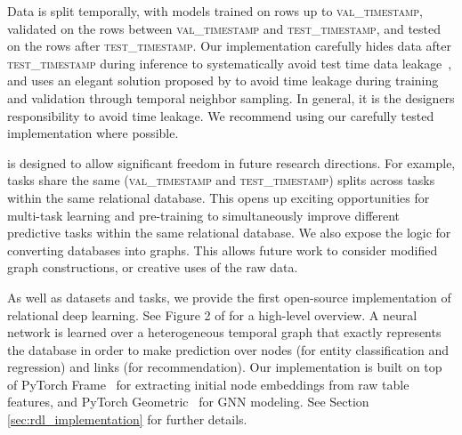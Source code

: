 \vspace{-2pt}
 Data is split temporally, with models trained on rows up to \textsc{val\_timestamp}, validated on the rows between \textsc{val\_timestamp} and \textsc{test\_timestamp}, and tested on the rows after \textsc{test\_timestamp}. 
    Our implementation carefully hides data after \textsc{test\_timestamp} during inference to systematically avoid test time data leakage~\citep{kapoor2023leakage}, and uses an elegant solution proposed by  \citet{fey2023relational} to avoid time leakage during training and validation through temporal neighbor sampling. In general, it is the designers responsibility to avoid time leakage. We recommend using our carefully tested implementation where possible.

\vspace{-2pt}
 \relbench is designed to allow significant freedom in future research directions. For example, \relbench tasks share the same (\textsc{val\_timestamp} and \textsc{test\_timestamp}) splits across tasks within the same relational database. This opens up exciting opportunities for multi-task learning and pre-training to simultaneously improve different predictive tasks within the same relational database. We also expose the logic for converting databases into graphs. This allows future work to consider modified graph constructions, or creative uses of the raw data.


\vspace{-2pt}
As well as datasets and tasks, we provide the first open-source implementation of relational deep learning. See Figure 2 of \citet{fey2023relational} for a high-level overview. A neural network is learned over a heterogeneous temporal graph that exactly represents the database in order to make prediction over nodes (for entity classification and regression) and links (for recommendation). Our implementation is built on top of PyTorch Frame~\citep{hu2024pytorch} for extracting initial node embeddings from raw table features, and PyTorch Geometric~\citep{fey2019fast} for GNN modeling. See Section \ref{sec:rdl_implementation} for further  details.



